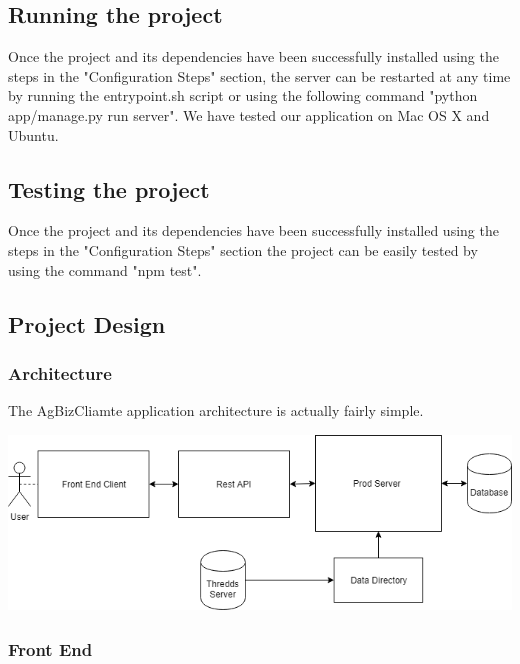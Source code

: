 \documentclass[onecolumn, draftclsnofoot,10pt, compsoc]{article}
\begin{document}
    \subsection{Running the project}
        Once the project and its dependencies have been successfully installed using the steps in the "Configuration Steps" section, the server can be restarted at any time by running the entrypoint.sh script or using the following command "python app/manage.py run server". We have tested our application on Mac OS X and Ubuntu.
    
    \subsection{Testing the project}
        Once the project and its dependencies have been successfully installed using the steps in the "Configuration Steps" section the project can be easily tested by using the command "npm test".
    
    \subsection{Project Design}
        \subsubsection{Architecture}
        The AgBizCliamte application architecture is actually fairly simple.  
        
        \begin{center}
        \includegraphics[width=15cm]{./Images/Architecture.png}
        \end{center}
        
        \subsubsection{Front End}
        
\end{document}
